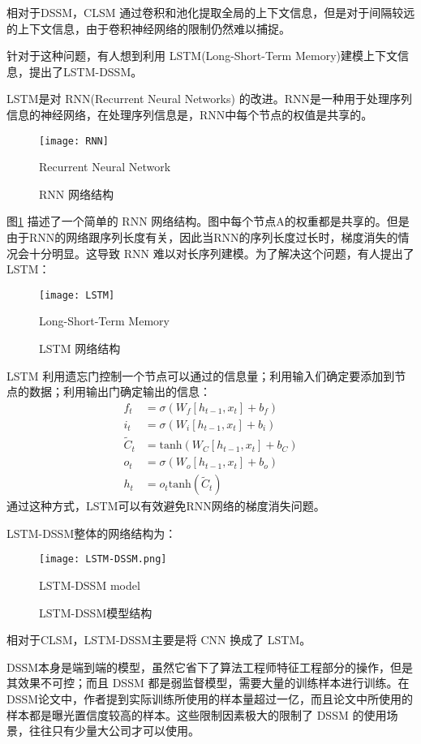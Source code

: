 相对于DSSM，CLSM 通过卷积和池化提取全局的上下文信息，但是对于间隔较远的上下文信息，由于卷积神经网络的限制仍然难以捕捉。

针对于这种问题，有人想到利用 LSTM\cite{Hochreiter1997LongSM}(Long-Short-Term Memory)建模上下文信息，提出了LSTM-DSSM\cite{Palangi2014SemanticMW}。

LSTM是对 RNN(Recurrent Neural Networks) 的改进。RNN是一种用于处理序列信息的神经网络，在处理序列信息是，RNN中每个节点的权值是共享的。

\begin{figure}[!htbp]\centering
  \texttt{[image: RNN]}
  \caption{RNN 网络结构}{Recurrent Neural Network}
  \label{fig:RNN}       %
\end{figure}

图\ref{fig:RNN} 描述了一个简单的 RNN 网络结构。图中每个节点A的权重都是共享的。但是由于RNN的网络跟序列长度有关，因此当RNN的序列长度过长时，梯度消失的情况会十分明显。这导致 RNN 难以对长序列建模。为了解决这个问题，有人提出了 LSTM：

\begin{figure}[!htbp]\centering
  \texttt{[image: LSTM]}
  \caption{LSTM 网络结构}{Long-Short-Term Memory}
  \label{fig:LSTM}       %
\end{figure}

LSTM 利用遗忘门控制一个节点可以通过的信息量；利用输入们确定要添加到节点的数据；利用输出门确定输出的信息：
$$
\begin{aligned}
f_t&=\sigma(W_f[h_{t-1}, x_t] + b_f) \\
i_t&=\sigma(W_i[h_{t-1}, x_t] + b_i)\\
\tilde{C}_t &= \text{tanh}(W_C[h_{t-1}, x_t] + b_C)\\
o_t&=\sigma(W_o[h_{t-1}, x_t] + b_o)\\
h_t&=o_t\text{tanh}(\tilde{C}_t)
\end{aligned}
$$
通过这种方式，LSTM可以有效避免RNN网络的梯度消失问题。

LSTM-DSSM整体的网络结构为：

\begin{figure}[H]\centering
  \texttt{[image: LSTM-DSSM.png]}
  \caption{LSTM-DSSM模型结构}{LSTM-DSSM model}
  \label{fig:LSTM-DSSM}       %
\end{figure}

相对于CLSM，LSTM-DSSM主要是将 CNN 换成了 LSTM。

DSSM本身是端到端的模型，虽然它省下了算法工程师特征工程部分的操作，但是其效果不可控；而且 DSSM 都是弱监督模型，需要大量的训练样本进行训练。在 DSSM论文中，作者提到实际训练所使用的样本量超过一亿，而且论文中所使用的样本都是曝光置信度较高的样本。这些限制因素极大的限制了 DSSM 的使用场景，往往只有少量大公司才可以使用。

